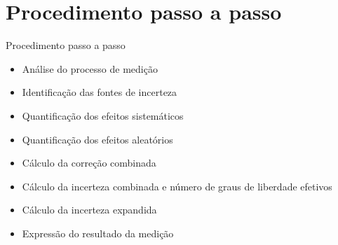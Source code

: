 \documentclass[aspectratio=169,xcolor=dvipsnames]{beamer}
\begin{document}
\section{Procedimento passo a passo}

\begin{frame}{Procedimento passo a passo}
    \begin{itemize}
   	 \item Análise do processo de medição
    	\item Identificação das fontes de incerteza
    	\item Quantificação dos efeitos sistemáticos
    	\item Quantificação dos efeitos aleatórios
    	\item Cálculo da correção combinada
    	\item Cálculo da incerteza combinada e número de graus de liberdade efetivos
    	\item Cálculo da incerteza expandida
    	\item Expressão do resultado da medição
   	 
    \end{itemize}
\end{frame}
\end{document}

